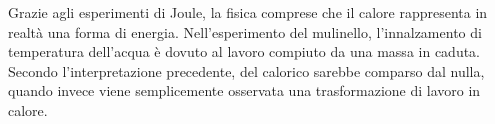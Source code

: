 Grazie agli esperimenti di Joule, la fisica comprese che il calore
rappresenta in realtà una forma di energia. Nell'esperimento del
mulinello, l'innalzamento di temperatura dell'acqua è dovuto al
lavoro compiuto da una massa in caduta. Secondo l'interpretazione
precedente, del calorico sarebbe comparso dal nulla, quando invece
viene semplicemente osservata una trasformazione di lavoro in calore.